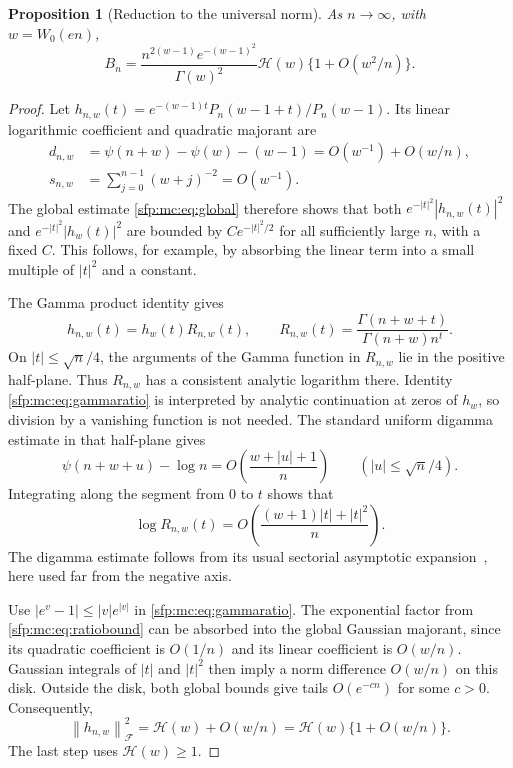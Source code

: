 \documentclass[11pt,letterpaper]{article}
\numberwithin{equation}{section}
\newtheorem{proposition}[theorem]{Proposition}
\theoremstyle{definition}\newtheorem{definition}[theorem]{Definition}
\theoremstyle{remark}\newtheorem{remark}[theorem]{Remark}
\newcommand{\Fock}[1]{\left\lVert #1\right\rVert_{\mathcal F}^{2}}
\begin{document}
\begin{proposition}[Reduction to the universal norm]\label{sfp:mc:prop:reduction}
As $n\to\infty$, with $w=W_0(en)$,
\begin{equation}\label{sfp:mc:eq:reduction}
 B_n=\frac{n^{2(w-1)}e^{-(w-1)^2}}{\Gamma(w)^2}
       \mathcal H(w)\{1+O(w^2/n)\}.
\end{equation}
\end{proposition}
\begin{proof}
Let
$h_{n,w}(t)=e^{-(w-1)t}P_n(w-1+t)/P_n(w-1)$.
Its linear logarithmic coefficient and quadratic majorant are
\begin{align*}
 d_{n,w}&=\psi(n+w)-\psi(w)-(w-1)
          =O(w^{-1})+O(w/n),\\
 s_{n,w}&=\sum_{j=0}^{n-1}(w+j)^{-2}=O(w^{-1}).
\end{align*}
The global estimate \eqref{sfp:mc:eq:global} therefore shows that both
$e^{-|t|^2}|h_{n,w}(t)|^2$ and
$e^{-|t|^2}|h_w(t)|^2$ are bounded by
$C e^{-|t|^2/2}$ for all sufficiently large $n$, with a fixed $C$.
This follows, for example, by absorbing the linear term into a
small multiple of $|t|^2$ and a constant.

The Gamma product identity gives
\begin{equation}\label{sfp:mc:eq:gammaratio}
 h_{n,w}(t)=h_w(t)R_{n,w}(t),\qquad
 R_{n,w}(t)=\frac{\Gamma(n+w+t)}{\Gamma(n+w)n^t}.
\end{equation}
On $|t|\leq\sqrt n/4$, the arguments of the Gamma function in
$R_{n,w}$ lie in the positive half-plane. Thus $R_{n,w}$ has a
consistent analytic logarithm there. Identity
\eqref{sfp:mc:eq:gammaratio} is interpreted by analytic continuation at
zeros of $h_w$, so division by a vanishing function is not needed.
The standard uniform digamma estimate in that half-plane gives
\[
 \psi(n+w+u)-\log n
   =O\left(\frac{w+|u|+1}{n}\right)
 \qquad(|u|\leq\sqrt n/4).
\]
Integrating along the segment from $0$ to $t$ shows that
\begin{equation}\label{sfp:mc:eq:ratiobound}
 \log R_{n,w}(t)
 =O\left(\frac{(w+1)|t|+|t|^2}{n}\right).
\end{equation}
The digamma estimate follows from its usual sectorial asymptotic
expansion~\cite{dlmf-mc}, here used far from the negative axis.

Use $|e^v-1|\leq |v|e^{|v|}$ in
\eqref{sfp:mc:eq:gammaratio}. The exponential factor from
\eqref{sfp:mc:eq:ratiobound} can be absorbed into the global Gaussian
majorant, since its quadratic coefficient is $O(1/n)$ and its
linear coefficient is $O(w/n)$. Gaussian integrals of $|t|$ and
$|t|^2$ then imply a norm difference $O(w/n)$ on this disk.
Outside the disk, both global bounds give tails $O(e^{-cn})$
for some $c>0$. Consequently,
\begin{equation}\label{sfp:mc:eq:normcompare}
 \Fock{h_{n,w}}=\mathcal H(w)+O(w/n)
               =\mathcal H(w)\{1+O(w/n)\}.
\end{equation}
The last step uses $\mathcal H(w)\geq1$.


\end{proof}
\end{document}
